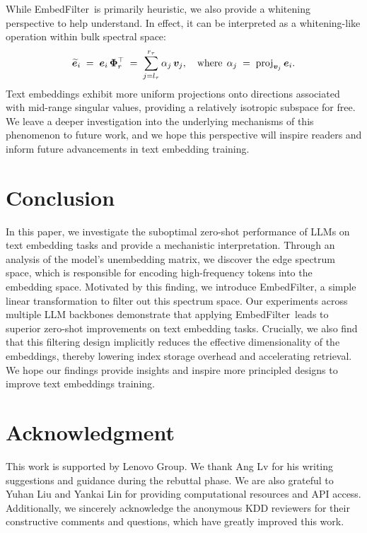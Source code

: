 \documentclass[sigconf]{acmart}
\newcommand{\name}{EmbedFilter}
\begin{document}
While \name\ is primarily heuristic, we also provide a whitening perspective to help understand. 
In effect, it can be interpreted as a whitening-like operation within bulk spectral space:
{\Large
\begin{equation*}
    \widetilde{{\bm{e}}}_i \; = \; {\bm{e}}_i \, \bm{\Phi}_r^\top \; = \; \sum_{j=l_\tau}^{r_\tau} \alpha_j \, {\bm{v}}_j, \quad \text{where} \;\, \alpha_j \; = \; \operatorname{proj}_{{\bm{v}}_j} {\bm{e}}_i.
\end{equation*}
}
Text embeddings exhibit more uniform projections onto directions associated with mid-range singular values, providing a relatively isotropic subspace for free.
We leave a deeper investigation into the underlying mechanisms of this phenomenon to future work, and we hope this perspective will inspire readers and inform future advancements in text embedding training.

\section{Conclusion}
In this paper, we investigate the suboptimal zero-shot performance of LLMs on text embedding tasks and provide a mechanistic interpretation.
Through an analysis of the model's unembedding matrix, we discover the edge spectrum space, which is responsible for encoding high-frequency tokens into the embedding space.
Motivated by this finding, we introduce \name, a simple linear transformation to filter out this spectrum space.
Our experiments across multiple LLM backbones demonstrate that applying \name\ leads to superior zero-shot improvements on text embedding tasks. 
Crucially, we also find that this filtering design implicitly reduces the effective dimensionality of the embeddings, thereby lowering index storage overhead and accelerating retrieval.
We hope our findings provide insights and inspire more principled designs to improve text embeddings training.

\section*{Acknowledgment}
This work is supported by Lenovo Group.
We thank Ang Lv for his writing suggestions and guidance during the rebuttal phase. 
We are also grateful to Yuhan Liu and Yankai Lin for providing computational resources and API access. 
Additionally, we sincerely acknowledge the anonymous KDD reviewers for their constructive comments and questions, which have greatly improved this work.
\end{document}
